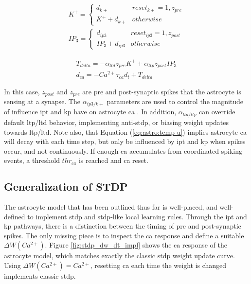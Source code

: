 \documentclass[conference]{IEEEtran}
\newcommand{\ca}{\gls{ca}\textrm{ }}
\newcommand{\cam}{Ca^{2+}}
\newcommand{\ipt}{\gls{ipt}\textrm{ }}
\newcommand{\kp}{\gls{kp}\textrm{ }}
\newcommand{\eq}[1]{Equation (\ref{#1})}
\begin{document}
\begin{align}
  K^+ =
  \begin{cases} 
    d_{k+} & reset_{k+} = 1, z_{pre}
    \\ K^+ + d_{k+} & otherwise
  \end{cases} \\
  IP_3 =
  \begin{cases} 
    d_{ip3} & reset_{ip3} = 1, z_{post}
    \\ IP_3 + d_{ip3} & otherwise
  \end{cases}
\end{align}

\begin{align}
T_{delta} = -\alpha_{ltd} z_{pre} K^+ + \alpha_{ltp} z_{post} IP_3\\
d_{ca} = -\cam \tau_{ca} d_t + T_{delta} \label{eq:astro:temp-u}
\end{align}

In this case, $z_{post}$ and $z_{pre}$ are pre and post-synaptic spikes that the
astrocyte is sensing at a synapse. The $\alpha_{ip3/k+}$ parameters are
used to control the magnitude of influence \ipt and \kp have on astrocyte
\ca. In addition, $\alpha_{ltd/ltp}$ can override default \gls{ltp}/\gls{ltd}
behavior, implementing anti-stdp, or biasing weight updates towards
\gls{ltp}/\gls{ltd}. Note also, that \eq{eq:astro:temp-u} implies astrocyte \ca
will decay with each time step, but only be influenced by \ipt and \kp when
spikes occur, and not continuously. If enough \ca accumulates from coordinated
spiking events, a threshold $thr_{ca}$ is reached and \ca reset.



\subsection{Generalization of STDP}

The astrocyte model that has been outlined thus far is well-placed, and
well-defined to implement \gls{stdp} and \gls{stdp}-like local learning
rules. Through the \gls{ipt} and \gls{kp} pathways, there is a distinction
between the timing of pre and post-synaptic spikes. The only missing piece is to
inspect the \ca response and define a suitable $\Delta W(\cam)$. Figure
\ref{fig:stdp_dw_dt_impl} shows the \ca response of the astrocyte model, which
matches exactly the classic \gls{stdp} weight update curve. Using $\Delta
W(\cam)=\cam$, resetting \ca each time the weight is changed implements classic
\gls{stdp}.
\end{document}
